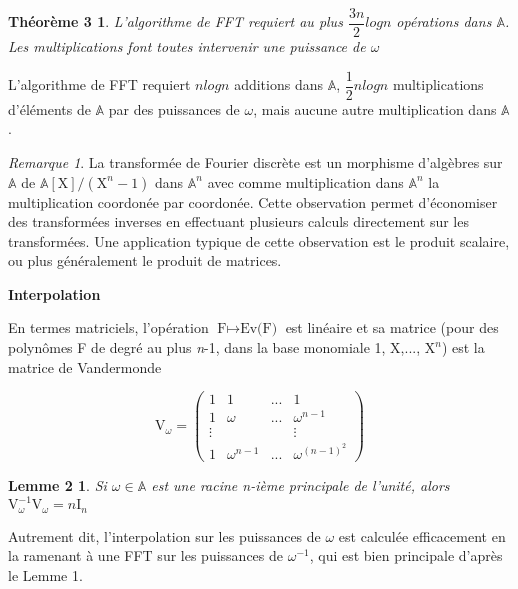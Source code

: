 \documentclass[a4paper]{article}
\begin{document}
\bigskip
\newtheorem*{thm3}{Théorème 3}
\begin{thm3}
    L'algorithme de FFT requiert au plus $\dfrac{3n}{2}logn$ opérations dans $\mathbb{A}$. Les multiplications font toutes intervenir une puissance de $\omega$
\end{thm3}

L'algorithme de FFT requiert $nlogn$ additions dans $\mathbb{A}$, $\dfrac{1}{2}nlogn$ multiplications d'éléments de $\mathbb{A}$ par des puissances de $\omega$, mais aucune autre multiplication dans $\mathbb{A}$.

\medskip
\theoremstyle{remark}
\newtheorem*{rem2}{Remarque}
\begin{rem2}
    La transformée de Fourier discrète est un morphisme d'algèbres sur $\mathbb{A}$ de $\mathbb{A}[\mathrm{X}]/(\mathrm{X}^n-1)$ dans $\mathbb{A}^n$ avec comme multiplication dans $\mathbb{A}^n$ la multiplication coordonée par coordonée.
    Cette observation permet d'économiser des transformées inverses en effectuant plusieurs calculs directement sur les transformées.
    Une application typique de cette observation est le produit scalaire, ou plus généralement le produit de matrices.
\end{rem2}

\bigskip
\textbf{Interpolation}

En termes matriciels, l'opération $\text{F}\mapsto\text{Ev(F)}$ est linéaire et sa matrice (pour des polynômes F de degré au plus \textit{n}-1, dans la base monomiale {1, X,..., $\mathrm{X}^n$}) est la matrice de Vandermonde

\[
\mathrm{V}_\omega =
\begin{pmatrix}
    1&1&...&1 \\
    1&\omega&...&\omega^{n-1} \\
    \vdots&&&\vdots \\
    1&\omega^{n-1}&...&\omega^{(n-1)^2} 

\end{pmatrix}
\]

\theoremstyle{plain}
\newtheorem*{lem2}{Lemme 2}
\begin{lem2}
    Si $\omega\in\mathbb{A}$ est une racine \textit{n}-ième principale de l'unité, alors $\mathrm{V}_\omega^{-1}\mathrm{V}_\omega=n\mathrm{I}_n$
\end{lem2}

Autrement dit, l'interpolation sur les puissances de $\omega$ est calculée efficacement en la ramenant à une FFT sur les puissances de $\omega^{-1}$, qui est bien principale d'après le Lemme 1.
\end{document}
